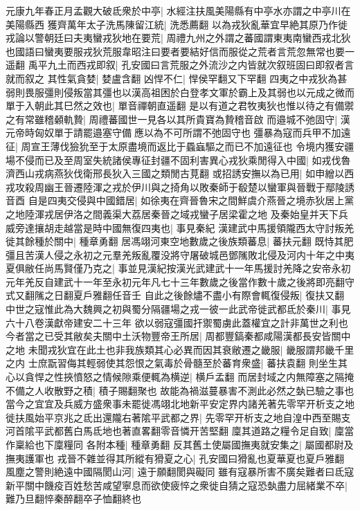 元康九年春正月孟觀大破氐衆於中亭|{
	水經注扶風美陽縣有中亭水亦謂之中亭川在美陽縣西}
獲齊萬年太子洗馬陳留江統|{
	洗悉薦翻}
以為戎狄亂華宜早絶其原乃作徙戎論以警朝廷曰夫夷蠻戎狄地在要荒|{
	周禮九州之外謂之蕃國謂東夷南蠻西戎北狄也國語曰蠻夷要服戎狄荒服韋昭注曰要者要結好信而服從之荒者言荒忽無常也要一遥翻}
禹平九土而西戎即叙|{
	孔安國曰言荒服之外流沙之内皆就次叙班固曰即叙者言就而叙之}
其性氣貪婪|{
	婪盧含翻}
凶悍不仁|{
	悍侯罕翻又下罕翻}
四夷之中戎狄為甚弱則畏服彊則侵叛當其彊也以漢高祖困於白登孝文軍於霸上及其弱也以元成之微而單于入朝此其巳然之效也|{
	單音禪朝直遥翻}
是以有道之君牧夷狄也惟以待之有備禦之有常雖稽顙軌贄|{
	周禮蕃國世一見各以其所貴寶為贄稽音啟}
而邉城不弛固守|{
	漢元帝時匈奴單于請罷邉塞守備應以為不可所謂不弛固守也}
彊暴為寇而兵甲不加遠征|{
	周宣王薄伐獫狁至于太原盡境而返比于蟁蝱驅之而已不加遠征也}
令境内獲安疆場不侵而已及至周室失統諸侯專征封疆不固利害異心戎狄乘閒得入中國|{
	如戎伐魯濟西山戎病燕狄伐衛邢長狄入三國之類閒古莧翻}
或招誘安撫以為已用|{
	如申繒以西戎攻殺周幽王晉遷陸渾之戎於伊川與之掎角以敗秦師于殽楚以蠻軍與晉戰于鄢陵誘音酉}
自是四夷交侵與中國錯居|{
	如徐夷在齊晉魯宋之間鮮虞介燕晉之境赤狄居上黨之地陸渾戎居伊洛之間義渠大荔居秦晉之域戎蠻子居梁霍之地}
及秦始皇并天下兵威旁達攘胡走越當是時中國無復四夷也|{
	事見秦紀}
漢建武中馬援領隴西太守討叛羌徙其餘種於關中|{
	種章勇翻}
居馮翊河東空地數歲之後族類蕃息|{
	蕃扶元翻}
既恃其肥彊且苦漢人侵之永初之元羣羌叛亂覆没將守屠破城邑鄧隲敗北侵及河内十年之中夷夏俱敝任尚馬賢僅乃克之|{
	事並見漢紀按漢光武建武十一年馬援討羌降之安帝永初元年羌反自建武十一年至永初元年凡七十三年數歲之後當作數十歲之後將即亮翻守式又翻隲之日翻夏戶雅翻任音壬}
自此之後餘燼不盡小有際會輒復侵叛|{
	復扶又翻}
中世之寇惟此為大魏興之初與蜀分隔疆場之戎一彼一此武帝徙武都氐於秦川|{
	事見六十八卷漢獻帝建安二十三年}
欲以弱寇彊國扞禦蜀虜此蓋權宜之計非萬世之利也今者當之已受其敝矣夫關中土沃物豐帝王所居|{
	周都豐鎬秦都咸陽漢都長安皆關中之地}
未聞戎狄宜在此土也非我族類其心必異而因其衰敝遷之畿服|{
	畿服謂邦畿千里之内}
士庶翫習侮其輕弱使其怨恨之氣毒於骨髓至於蕃育衆盛|{
	蕃扶袁翻}
則坐生其心以貪悍之性挾憤怒之情候隙乘便輒為横逆|{
	横戶孟翻}
而居封域之内無障塞之隔掩不備之人收散野之積|{
	積子賜翻聚也}
故能為禍滋蔓暴害不測此必然之埶已驗之事也當今之宜宜及兵威方盛衆事未罷徙馮翊北地新平安定界内諸羌著先零罕开析支之地徙扶風始平京兆之氐出還隴右著隂平武都之界|{
	先零罕开析支之地自湟中西至賜支河首隂平武都舊白馬氐地也著直畧翻零音憐开苦堅翻}
廩其道路之糧令足自致|{
	廩當作稟給也下廩糧同}
各附本種|{
	種章勇翻}
反其舊土使屬國撫夷就安集之|{
	屬國都尉及撫夷護軍也}
戎晉不雜並得其所縱有猾夏之心|{
	孔安國曰猾亂也夏華夏也夏戶雅翻}
風塵之警則絶遠中國隔閡山河|{
	遠于願翻閡與礙同}
雖有寇暴所害不廣矣難者曰氐寇新平關中饑疫百姓愁苦咸望寧息而欲使疲悴之衆徙自猜之寇恐埶盡力屈緒業不卒|{
	難乃旦翻悴秦醉翻卒子恤翻終也}

